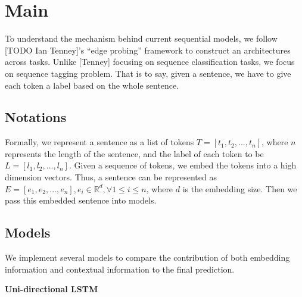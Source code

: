 \documentclass{article}
\newcommand{\red}[1]{\textcolor{red}{#1}}
\begin{document}

\section{Main}

To understand the mechanism behind current sequential models, we follow [TODO Ian Tenney]'s ``edge probing'' framework to construct an architectures across tasks. Unlike [Tenney] focusing on sequence classification tasks, we focus on sequence tagging problem. That is to say, given a sentence, we have to give each token a label based on the whole sentence.

\subsection{Notations}
Formally, we represent a sentence as a list of tokens $T = [t_1, t_2, ... , t_n]$, where $n$ represents the length of the sentence, and the label of each token to be $L = [l_1, l_2, ... , l_n]$. Given a sequence of tokens, we embed the tokens into a high dimension vectors. Thus, a sentence can be represented as $E = [e_1, e_2, ... , e_n], e_i \in \mathbb{R}^d, \forall 1 \leq i \leq n$, where $d$ is the embedding size. Then we pass this embedded sentence into models.


\subsection{Models}

We implement several models to compare the contribution of both embedding information and contextual information to the final prediction. 


\textbf{Uni-directional LSTM}
\end{document}
